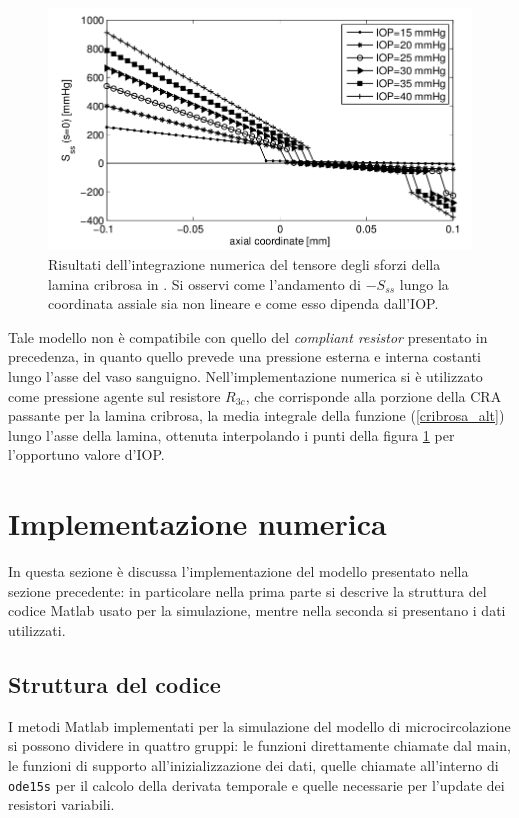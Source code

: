 \documentclass{article}
\begin{document}
\begin{figure}[h]
\begin{center}
\includegraphics[width=1.0\textwidth]{Pictures/riscribrosa.png}
\caption{Risultati dell'integrazione numerica del tensore degli sforzi della lamina cribrosa in \cite{art3}. Si osservi come l'andamento di $-S_{ss}$ lungo la coordinata assiale sia non lineare e come esso dipenda dall'IOP.}
\label{riscribrosa}
\end{center}
\end{figure}

Tale modello non è compatibile con quello del \textit{compliant resistor} presentato in precedenza, in quanto quello prevede una pressione esterna e interna costanti lungo l'asse del vaso sanguigno.
Nell'implementazione numerica si è utilizzato come pressione agente sul resistore $R_{3c}$, che corrisponde alla porzione della CRA passante per la lamina cribrosa, la media integrale della funzione (\ref{cribrosa_alt}) lungo l'asse della lamina, ottenuta interpolando i punti della figura \ref{riscribrosa} per l'opportuno valore d'IOP.

\section{Implementazione numerica}
In questa sezione è discussa l'implementazione del modello presentato nella sezione precedente: in particolare nella prima parte si descrive la struttura del codice Matlab usato per la simulazione, mentre nella seconda si presentano i dati utilizzati.
\subsection{Struttura del codice}
I metodi Matlab implementati per la simulazione del modello di microcircolazione si possono dividere in quattro gruppi: le funzioni direttamente chiamate dal main, le funzioni di supporto all'inizializzazione dei dati, quelle chiamate all'interno di \texttt{ode15s} per il calcolo della derivata temporale e quelle necessarie per l'update dei resistori variabili.
\end{document}

